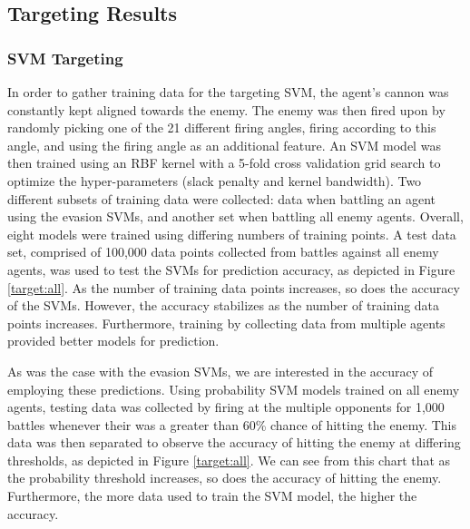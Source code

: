 \documentclass{article}
\theoremstyle{plain}
\theoremstyle{definition}
\theoremstyle{remark}
\begin{document}
\subsection*{Targeting Results}
\subsubsection*{SVM Targeting}
In order to gather training data for the targeting SVM, the agent's cannon was constantly kept aligned towards the enemy. The enemy was then fired upon by randomly picking one of the 21 different firing angles, firing according to this angle, and using the firing angle as an additional feature. An SVM model was then trained using an RBF kernel with a 5-fold cross validation grid search to optimize the hyper-parameters (slack penalty and kernel bandwidth). Two different subsets of training data were collected: data when battling an agent using the evasion SVMs, and another set when battling all enemy agents. Overall, eight models were trained using differing numbers of training points. A test data set, comprised of 100,000 data points collected from battles against all enemy agents, was used to test the SVMs for prediction accuracy, as depicted in Figure \ref{target:all}. As the number of training data points increases, so does the accuracy of the SVMs. However, the accuracy stabilizes as the number of training data points increases. Furthermore, training by collecting data from multiple agents provided better models for prediction. 

As was the case with the evasion SVMs, we are interested in the accuracy of employing these predictions. Using probability SVM models trained on all enemy agents, testing data was collected by firing at the multiple opponents for 1,000 battles whenever their was a greater than 60\% chance of hitting the enemy. This data was then separated to observe the accuracy of hitting the enemy at differing thresholds, as depicted in Figure \ref{target:all}. We can see from this chart that as the probability threshold increases, so does the accuracy of hitting the enemy. Furthermore, the more data used to train the SVM model, the higher the accuracy. 
\end{document}
